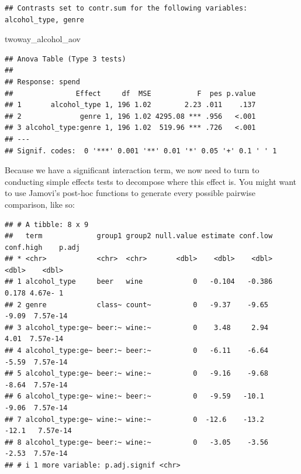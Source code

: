 \documentclass[
]{book}
\newenvironment{Shaded}{\begin{snugshade}}{\end{snugshade}}
\newcommand{\FunctionTok}[1]{\textcolor[rgb]{0.13,0.29,0.53}{\textbf{#1}}}
\newcommand{\NormalTok}[1]{#1}
\newcommand{\SpecialCharTok}[1]{\textcolor[rgb]{0.81,0.36,0.00}{\textbf{#1}}}
\begin{document}
\begin{verbatim}
## Contrasts set to contr.sum for the following variables: alcohol_type, genre
\end{verbatim}

\begin{Shaded}
\begin{Highlighting}[]
\NormalTok{twoway\_alcohol\_aov}
\end{Highlighting}
\end{Shaded}

\begin{verbatim}
## Anova Table (Type 3 tests)
## 
## Response: spend
##               Effect     df  MSE           F  pes p.value
## 1       alcohol_type 1, 196 1.02        2.23 .011    .137
## 2              genre 1, 196 1.02 4295.08 *** .956   <.001
## 3 alcohol_type:genre 1, 196 1.02  519.96 *** .726   <.001
## ---
## Signif. codes:  0 '***' 0.001 '**' 0.01 '*' 0.05 '+' 0.1 ' ' 1
\end{verbatim}

Because we have a significant interaction term, we now need to turn to conducting simple effects tests to decompose where this effect is. You might want to use Jamovi's post-hoc functions to generate every possible pairwise comparison, like so:

\begin{Shaded}
\end{Shaded}

\begin{verbatim}
## # A tibble: 8 x 9
##   term             group1 group2 null.value estimate conf.low conf.high    p.adj
## * <chr>            <chr>  <chr>       <dbl>    <dbl>    <dbl>     <dbl>    <dbl>
## 1 alcohol_type     beer   wine            0   -0.104   -0.386     0.178 4.67e- 1
## 2 genre            class~ count~          0   -9.37    -9.65     -9.09  7.57e-14
## 3 alcohol_type:ge~ beer:~ wine:~          0    3.48     2.94      4.01  7.57e-14
## 4 alcohol_type:ge~ beer:~ beer:~          0   -6.11    -6.64     -5.59  7.57e-14
## 5 alcohol_type:ge~ beer:~ wine:~          0   -9.16    -9.68     -8.64  7.57e-14
## 6 alcohol_type:ge~ wine:~ beer:~          0   -9.59   -10.1      -9.06  7.57e-14
## 7 alcohol_type:ge~ wine:~ wine:~          0  -12.6    -13.2     -12.1   7.57e-14
## 8 alcohol_type:ge~ beer:~ wine:~          0   -3.05    -3.56     -2.53  7.57e-14
## # i 1 more variable: p.adj.signif <chr>
\end{verbatim}
\end{document}
